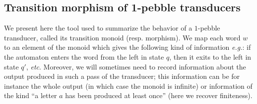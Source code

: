 \documentclass{article}
\theoremstyle{definition}
\theoremstyle{remark}
\begin{document}
\begin{comment}
    A regular function has at most linear growth, but its output may be smaller than that. Let us show that there is a dichotomy: either a regular function has linear or bounded output size. This is not very hard to see: intuitively, either there is an input word with a part that can be pumped and which produces something, and then the length of the output is linear in the number of times the loop is pumped; or there is no such part, which means that any pumpable part can be removed without changing the output length, hence the output size is bounded.
    This not very deep result will serve as a stepping stone for the main contribution of the article.
\end{comment}

\subsection{Transition morphism of 1-pebble transducers}
We present here the tool used to summarize the behavior of a $1$-pebble transducer, called its transition monoid (resp. morphism). We map each word $w$ to an element of the monoid which gives the following kind of information \textit{e.g.}: if the automaton enters the word from the left in state $q$, then it exits to the left in state $q'$, \textit{etc}.
Moreover, we will sometimes need to record information about the output produced in such a pass of the transducer; this information can be for instance the whole output (in which case the monoid is infinite) or information of the kind ``a letter $a$ has been produced at least once'' (here we recover finiteness).

  
   
\end{document}
